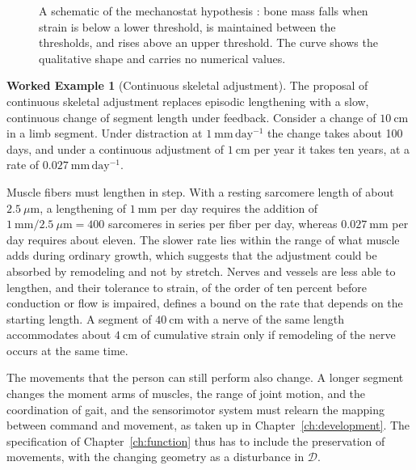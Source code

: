 \documentclass[11pt,openany]{book}
\theoremstyle{definition}
\newtheorem{example}{Worked Example}[chapter]
\theoremstyle{remark}
\newcommand{\Dset}{\mathcal{D}}
\begin{document}
\begin{figure}[ht]
\centering
{}
\caption{A schematic of the mechanostat hypothesis \cite{frost1987}: bone mass falls when strain is below a lower threshold, is maintained between the thresholds, and rises above an upper threshold. The curve shows the qualitative shape and carries no numerical values.}
\label{fig:mechanostat}
\end{figure}

\begin{example}[Continuous skeletal adjustment]
\label{ex:skeletal}
The proposal of continuous skeletal adjustment replaces episodic lengthening with a slow, continuous change of segment length under feedback. Consider a change of $10\ \mathrm{cm}$ in a limb segment. Under distraction at $1\ \mathrm{mm\,day^{-1}}$ the change takes about 100 days, and under a continuous adjustment of $1\ \mathrm{cm}$ per year it takes ten years, at a rate of $0.027\ \mathrm{mm\,day^{-1}}$.

Muscle fibers must lengthen in step. With a resting sarcomere length of about $2.5\ \mu\mathrm{m}$, a lengthening of $1\ \mathrm{mm}$ per day requires the addition of $1\ \mathrm{mm}/2.5\ \mu\mathrm{m}=400$ sarcomeres in series per fiber per day, whereas $0.027\ \mathrm{mm}$ per day requires about eleven. The slower rate lies within the range of what muscle adds during ordinary growth, which suggests that the adjustment could be absorbed by remodeling and not by stretch. Nerves and vessels are less able to lengthen, and their tolerance to strain, of the order of ten percent before conduction or flow is impaired, defines a bound on the rate that depends on the starting length. A segment of $40\ \mathrm{cm}$ with a nerve of the same length accommodates about $4\ \mathrm{cm}$ of cumulative strain only if remodeling of the nerve occurs at the same time.

The movements that the person can still perform also change. A longer segment changes the moment arms of muscles, the range of joint motion, and the coordination of gait, and the sensorimotor system must relearn the mapping between command and movement, as taken up in Chapter~\ref{ch:development}. The specification of Chapter~\ref{ch:function} thus has to include the preservation of movements, with the changing geometry as a disturbance in $\Dset$.
\end{example}
\end{document}
